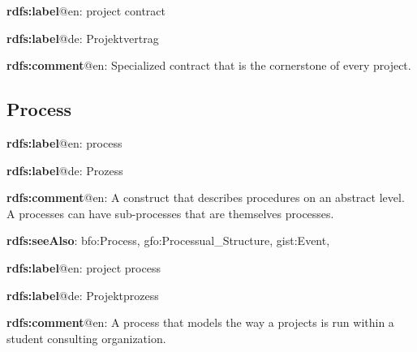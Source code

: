 \documentclass[a4paper, DIV=13, BCOR=0cm]{scrbook}
\begin{document}
\begin{mdframed}[style=onto-2, frametitle={Project\_Contract}]
	{%
		\begin{compactitem}
			\item \textbf{rdfs:label}@en: project contract
			\item \textbf{rdfs:label}@de: Projektvertrag
			\item \textbf{rdfs:comment}@en: Specialized contract that is the cornerstone of every project.
		\end{compactitem}
	} %
\end{mdframed}

\subsection{Process}

\begin{mdframed}[style=onto, frametitle={Process}]
	{%
		\begin{compactitem}
			\item \textbf{rdfs:label}@en: process
			\item \textbf{rdfs:label}@de: Prozess
			\item \textbf{rdfs:comment}@en: A construct that describes procedures on an abstract level. A processes can have sub-processes that are themselves processes.
			\item \textbf{rdfs:seeAlso}: bfo:Process, gfo:Processual\_Structure, gist:Event, 
		\end{compactitem}
	} %
\end{mdframed}

\begin{mdframed}[style=onto-1, frametitle={Project\_Process}]
	{%
		\begin{compactitem}
			\item \textbf{rdfs:label}@en: project process
			\item \textbf{rdfs:label}@de: Projektprozess
			\item \textbf{rdfs:comment}@en: A process that models the way a projects is run within a student consulting organization.
		\end{compactitem}
	} %
\end{mdframed}
\end{document}
